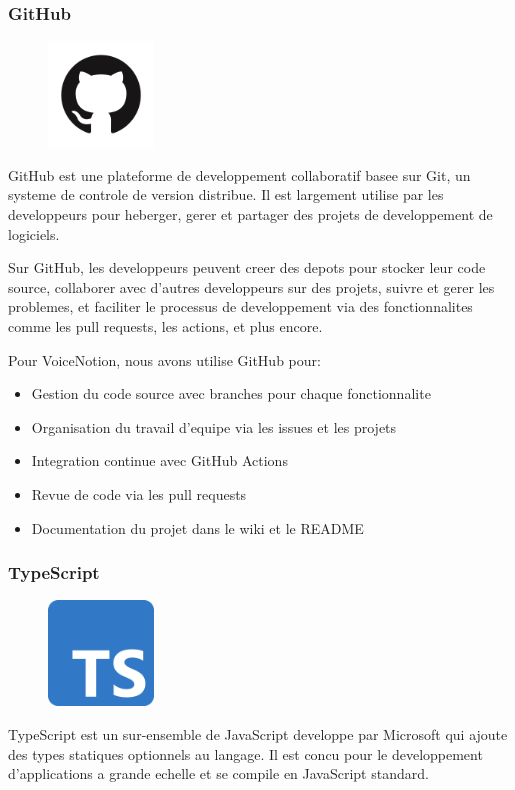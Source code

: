 \subsubsection{GitHub}
\begin{figure}
    \centering
    \includegraphics[width=0.25\textwidth]{assets/docs/github.png}
\end{figure}
GitHub est une plateforme de developpement collaboratif basee sur Git, un systeme de controle de version distribue. Il est largement utilise par les developpeurs pour heberger, gerer et partager des projets de developpement de logiciels.

Sur GitHub, les developpeurs peuvent creer des depots pour stocker leur code source, collaborer avec d'autres developpeurs sur des projets, suivre et gerer les problemes, et faciliter le processus de developpement via des fonctionnalites comme les pull requests, les actions, et plus encore.

Pour VoiceNotion, nous avons utilise GitHub pour:
\begin{itemize}
    \item Gestion du code source avec branches pour chaque fonctionnalite
    \item Organisation du travail d'equipe via les issues et les projets
    \item Integration continue avec GitHub Actions
    \item Revue de code via les pull requests
    \item Documentation du projet dans le wiki et le README
\end{itemize}

\subsubsection{TypeScript}
\begin{figure}
    \centering
    \includegraphics[width=0.25\textwidth]{assets/docs/typescript.png}
\end{figure}
TypeScript est un sur-ensemble de JavaScript developpe par Microsoft qui ajoute des types statiques optionnels au langage. Il est concu pour le developpement d'applications a grande echelle et se compile en JavaScript standard.

